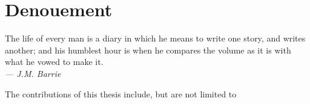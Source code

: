 
  \chapter{Denouement}
  \label{chp:outro}

  \begin{flushright}
    \begin{minipage}[]{0.55\linewidth}
      \begin{flushright}
        The life of every man is a diary in which he means to write
        one story, and writes another; and his humblest hour is when
        he compares the volume as it is with what he vowed to make
        it. \\{\small \emph{--- J.M. Barrie} }
      \end{flushright}
    \end{minipage}
  \end{flushright}
  \vspace{\baselineskip}


  The contributions of this thesis include, but are not limited to

